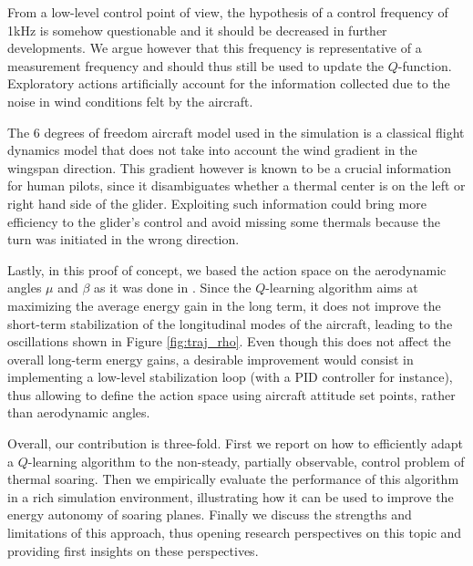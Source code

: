 \documentclass{jfpda}
\begin{document}
From a low-level control point of view, the hypothesis of a control frequency of 1kHz is somehow questionable and it should be decreased in further developments. We argue however that this frequency is representative of a measurement frequency and should thus still be used to update the $Q$-function. Exploratory actions artificially account for the information collected due to the noise in wind conditions felt by the aircraft.

The 6 degrees of freedom aircraft model used in the simulation is a classical flight dynamics model that does not take into account the wind gradient in the wingspan direction. This gradient however is known to be a crucial information for human pilots, since it disambiguates whether a thermal center is on the left or right hand side of the glider. Exploiting such information could bring more efficiency to the glider's control and avoid missing some thermals because the turn was initiated in the wrong direction.

Lastly, in this proof of concept, we based the action space on the aerodynamic angles $\mu$ and $\beta$ as it was done in \cite{dynamic}. Since the $Q$-learning algorithm aims at maximizing the average energy gain in the long term, it does not improve the short-term stabilization of the longitudinal modes of the aircraft, leading to the oscillations shown in Figure \ref{fig:traj_rho}. Even though this does not affect the overall long-term energy gains, a desirable improvement would consist in implementing a low-level stabilization loop (with a PID controller for instance), thus allowing to define the action space using aircraft attitude set points, rather than aerodynamic angles.

Overall, our contribution is three-fold. First we report on how to efficiently adapt a $Q$-learning algorithm to the non-steady, partially observable, control problem of thermal soaring. Then we empirically evaluate the performance of this algorithm in a rich simulation environment, illustrating how it can be used to improve the energy autonomy of soaring planes. Finally we discuss the strengths and limitations of this approach, thus opening research perspectives on this topic and providing first insights on these perspectives.
\end{document}
